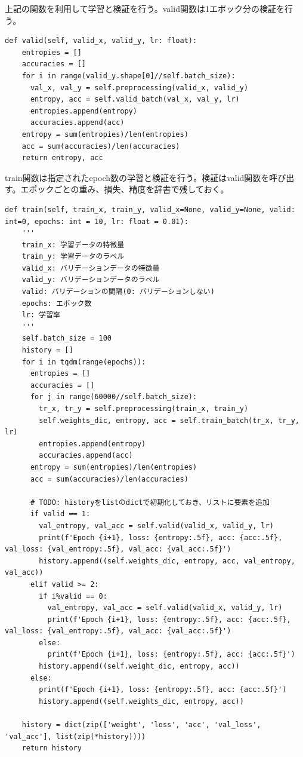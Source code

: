 \documentclass[platex,dvipdfmx]{jsarticle}
\begin{document}
上記の関数を利用して学習と検証を行う。valid関数は1エポック分の検証を行う。

\begin{lstlisting}[caption=ex\_advanced.py, label=valid]
  def valid(self, valid_x, valid_y, lr: float):
    entropies = []
    accuracies = []
    for i in range(valid_y.shape[0]//self.batch_size):
      val_x, val_y = self.preprocessing(valid_x, valid_y)
      entropy, acc = self.valid_batch(val_x, val_y, lr)
      entropies.append(entropy)
      accuracies.append(acc)
    entropy = sum(entropies)/len(entropies)
    acc = sum(accuracies)/len(accuracies)
    return entropy, acc
\end{lstlisting}

train関数は指定されたepoch数の学習と検証を行う。検証はvalid関数を呼び出す。エポックごとの重み、損失、精度を辞書で残しておく。

\begin{lstlisting}[caption=ex\_advanced.py, label=train]
  def train(self, train_x, train_y, valid_x=None, valid_y=None, valid: int=0, epochs: int = 10, lr: float = 0.01):
    '''
    train_x: 学習データの特徴量
    train_y: 学習データのラベル
    valid_x: バリデーションデータの特徴量
    valid_y: バリデーションデータのラベル
    valid: バリデーションの間隔(0: バリデーションしない)
    epochs: エポック数
    lr: 学習率
    '''
    self.batch_size = 100
    history = []
    for i in tqdm(range(epochs)):
      entropies = []
      accuracies = []
      for j in range(60000//self.batch_size):
        tr_x, tr_y = self.preprocessing(train_x, train_y)
        self.weights_dic, entropy, acc = self.train_batch(tr_x, tr_y, lr)
        entropies.append(entropy)
        accuracies.append(acc)
      entropy = sum(entropies)/len(entropies)
      acc = sum(accuracies)/len(accuracies)

      # TODO: historyをlistのdictで初期化しておき、リストに要素を追加
      if valid == 1:
        val_entropy, val_acc = self.valid(valid_x, valid_y, lr)
        print(f'Epoch {i+1}, loss: {entropy:.5f}, acc: {acc:.5f}, val_loss: {val_entropy:.5f}, val_acc: {val_acc:.5f}')
        history.append((self.weights_dic, entropy, acc, val_entropy, val_acc))
      elif valid >= 2:
        if i%valid == 0:
          val_entropy, val_acc = self.valid(valid_x, valid_y, lr)
          print(f'Epoch {i+1}, loss: {entropy:.5f}, acc: {acc:.5f}, val_loss: {val_entropy:.5f}, val_acc: {val_acc:.5f}')
        else:
          print(f'Epoch {i+1}, loss: {entropy:.5f}, acc: {acc:.5f}')
        history.append((self.weight_dic, entropy, acc))
      else:
        print(f'Epoch {i+1}, loss: {entropy:.5f}, acc: {acc:.5f}')
        history.append((self.weights_dic, entropy, acc))
    
    history = dict(zip(['weight', 'loss', 'acc', 'val_loss', 'val_acc'], list(zip(*history))))
    return history
\end{lstlisting}
\end{document}
